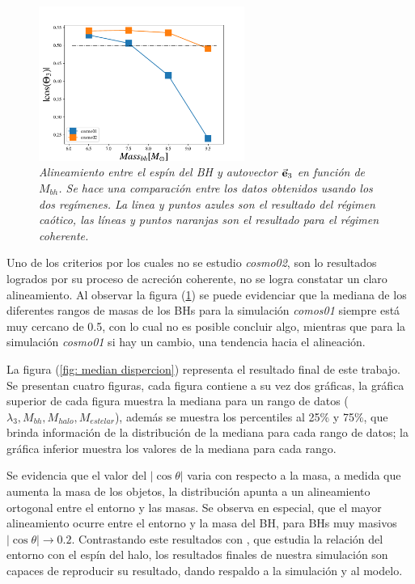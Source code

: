 \begin{figure}
    \centering
    \includegraphics[width=0.6\textwidth]{./figures/6_Resultados/cosmo01/relacion_simulaciones_Mass_bh.pdf}
    \caption{\emph{Alineamiento entre el espín del BH y autovector $\vec{\bf{e}}_3$ en función de $M_{bh}$. Se hace una comparación entre los datos obtenidos usando los dos regímenes. La linea y puntos azules son el resultado del régimen caótico, las líneas y puntos naranjas son el resultado para el régimen coherente.}}
    \label{fig: comparacion cosmo01 y cosmo02}
\end{figure}
 
Uno de los criterios por los cuales no se estudio {\it{cosmo02}}, son lo resultados logrados por su proceso de acreción coherente, no se logra constatar un claro  alineamiento. Al observar la figura (\ref{fig: comparacion cosmo01 y cosmo02}) se puede evidenciar que la mediana de los diferentes rangos de masas de los BHs para la simulación {\it{comos01}} siempre está muy cercano de 0.5, con lo cual no es posible concluir algo, mientras que para la simulación {\it{cosmo01}} si hay un cambio, una tendencia hacia el alineación. 

La figura (\ref{fig: median dispercion}) representa el resultado final de este trabajo. Se presentan cuatro  figuras, cada figura contiene a su vez dos gráficas, la gráfica superior de cada figura muestra la mediana para un rango de datos ($\lambda_{3}, M_{bh}, M_{halo}, M_{estelar}$), además se muestra los percentiles al 25$\%$ y 75$\%$, que brinda información de la distribución de la mediana para cada rango de datos; la gráfica inferior muestra los valores de la  mediana para cada rango.

Se evidencia que el valor del $|\cos \theta|$ varia con respecto a la masa, a medida que aumenta la masa de los objetos, la distribución apunta a un alineamiento ortogonal entre el entorno y las masas. Se observa en especial, que el mayor alineamiento ocurre entre el entorno y la masa del BH, para BHs muy masivos $|\cos\theta| \to 0.2$. Contrastando este resultados con \cite{wang2018}, que estudia la relación del entorno con el espín del halo, los resultados finales de nuestra simulación son capaces de reproducir su resultado, dando  respaldo a la simulación y al modelo.

